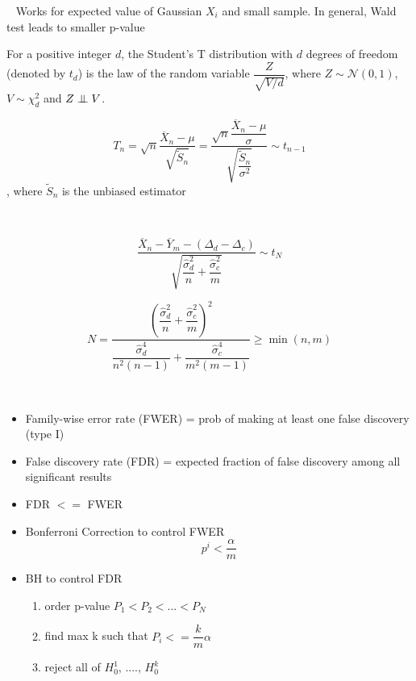 \documentclass[a4paper, 10pt,landscape]{article}
\newcommand\independent{\protect\mathpalette{\protect\independenT}{\perp}}
\def\independenT#1#2{\mathrel{\setbox0\hbox{$#1#2$}%
    \copy0\kern-\wd0\mkern4mu\box0}}
\begin{document}
\begin{multicols*}{3}
\begin{description}
		\item[On sample T test]~
			Works for expected value of Gaussian $X_i$ and small sample. In general, Wald test leads to smaller p-value		

			For a positive integer $d$, the Student's T distribution with $d$ degrees of freedom (denoted by $t_d$) is the law of the random variable $\dfrac{Z}{\sqrt{V/d}}$, where $Z\sim\mathcal{N}(0,1)$, $V\sim\chi_d^2$ and $Z\independent V$.
			
			\item $$T_n=\sqrt{n}\dfrac{\overline{X}_n - \mu}{\sqrt{\widetilde{S}_n}}=\dfrac{\sqrt{n}\dfrac{\overline{X}_n-\mu}{\sigma}}{\sqrt{\dfrac{\widetilde{S}_n}{\sigma^2}}} \sim t_{n-1}$$, where $\widetilde{S}_n$ is the unbiased estimator

		\item[Two sample T test]~

			$$\dfrac{\overline{X}_n-\overline{Y}_m-\left(\Delta_d-\Delta_c\right)}{\sqrt{\dfrac{\widehat{\sigma}_d^2}{n}+\dfrac{\widehat{\sigma}_c^2}{m}}}\sim t_N$$
			
			$$N=\dfrac{\left(\dfrac{\widehat{\sigma}_d^2}{n}+\dfrac{\widehat{\sigma}_c^2}{m}\right)^2}{\dfrac{\widehat{\sigma}_d^4}{n^2(n-1)}+\dfrac{\widehat{\sigma}_c^4}{m^2(m-1)}}\geq\min(n,m)$$

		\item[Multiple Test]~
			\begin{itemize}
				\item Family-wise error rate (FWER) = prob of making at least one false discovery (type I)
				\item False discovery rate (FDR) = expected fraction of false discovery among all significant results
				\item FDR $<=$ FWER
				\item Bonferroni Correction to control FWER
					$$p^i < \dfrac{\alpha}{m}$$
				\item BH to control FDR
					\begin{enumerate}
						\item order p-value $P_1 < P_2 < ... < P_N$
						\item find max k such that $P_i <= \dfrac{k}{m} \alpha$
						\item reject all of $H_0^1$, ...., $H_0^k$
					\end{enumerate}
			\end{itemize}
\end{description}		


\end{multicols*}
\end{document}
